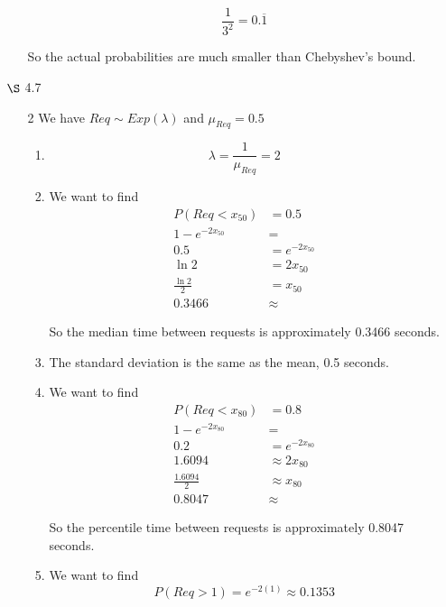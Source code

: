 \documentclass[12pt,letterpaper]{article}
\begin{document}
\begin{enumerate}
\begin{enumerate}
\begin{enumerate}
              \[
                \frac{1}{3^2} = 0.\overline{1}
              \]
          \end{enumerate}

          So the actual probabilities are much smaller than Chebyshev's bound.
      \end{enumerate}

    \item [$\S$ 4.7]
      \begin{enumerate}
        \item [2]
          We have $Req \sim Exp(\lambda)$ and $\mu_{Req} = 0.5$
          \begin{enumerate}[label=(\arabic*)]
            \item
              \[
                \lambda = \frac{1}{\mu_{Req}} = 2
              \]
            \item
              We want to find
              \begin{align*}
                P(Req < x_{50}) &= 0.5 \\
                1 - e^{-2x_{50}} &= \\
                0.5 &= e^{-2x_{50}} \\
                \ln 2 &= 2x_{50} \\
                \frac{\ln 2}{2} &= x_{50} \\
                0.3466 &\approx
              \end{align*}

              So the median time between requests is approximately 0.3466 seconds.
            \item
              The standard deviation is the same as the mean, 0.5 seconds.
            \item
              We want to find
              \begin{align*}
                P(Req < x_{80}) &= 0.8 \\
                1 - e^{-2x_{80}} &= \\
                0.2 &= e^{-2x_{80}} \\
                1.6094 &\approx 2x_{80} \\
                \frac{1.6094}{2} &\approx x_{80} \\
                0.8047 &\approx
              \end{align*}

              So the  percentile time between requests is approximately 0.8047 seconds.
            \item
              We want to find
              \[
                P(Req > 1) = e^{-2(1)} \approx 0.1353
              \]


\end{enumerate}
\end{enumerate}
\end{enumerate}
\end{document}

